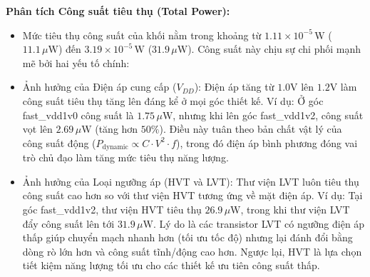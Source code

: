 \documentclass[12pt,a4paper,oneside]{book}
\begin{document}
\textbf{Phân tích Công suất tiêu thụ (Total Power):}
\begin{itemize}
    \item Mức tiêu thụ công suất của khối nằm trong khoảng từ $1.11 \times 10^{-5}\,\text{W}$ ($11.1\,\mu\text{W}$) đến $3.19 \times 10^{-5}\,\text{W}$ ($31.9\,\mu\text{W}$). Công suất này chịu sự chi phối mạnh mẽ bởi hai yếu tố chính:
    \item Ảnh hưởng của Điện áp cung cấp ($V_{DD}$): Điện áp tăng từ $1.0\text{V}$ lên $1.2\text{V}$ làm công suất tiêu thụ tăng lên đáng kể ở mọi góc thiết kế. Ví dụ: Ở góc fast\_vdd1v0 công suất là $1.75\,\mu\text{W}$, nhưng khi lên góc fast\_vdd1v2, công suất vọt lên $2.69\,\mu\text{W}$ (tăng hơn $50\%$). Điều này tuân theo bản chất vật lý của công suất động ($P_{\text{dynamic}} \propto C \cdot V^2 \cdot f$), trong đó điện áp bình phương đóng vai trò chủ đạo làm tăng mức tiêu thụ năng lượng.
    \item Ảnh hưởng của Loại ngưỡng áp (HVT và LVT): Thư viện LVT luôn tiêu thụ công suất cao hơn so với thư viện HVT tương ứng về mặt điện áp. Ví dụ: Tại góc fast\_vdd1v2, thư viện HVT tiêu thụ $26.9\,\mu\text{W}$, trong khi thư viện LVT đẩy công suất lên tới $31.9\,\mu\text{W}$. Lý do là các transistor LVT có ngưỡng điện áp thấp giúp chuyển mạch nhanh hơn (tối ưu tốc độ) nhưng lại đánh đổi bằng dòng rò lớn hơn và công suất tĩnh/động cao hơn. Ngược lại, HVT là lựa chọn tiết kiệm năng lượng tối ưu cho các thiết kế ưu tiên công suất thấp.
\end{itemize}
\end{document}
